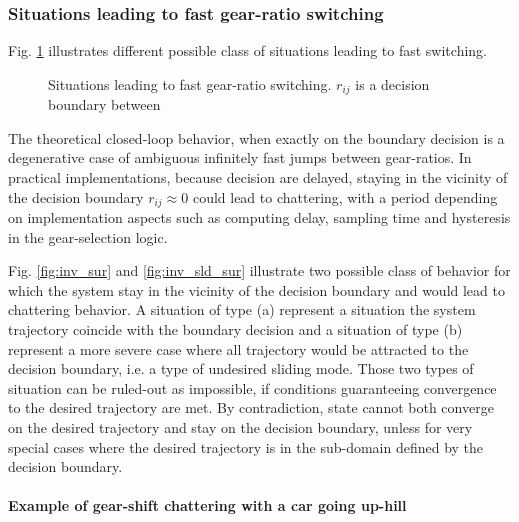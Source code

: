\subsubsection{Situations leading to fast gear-ratio switching}

Fig. \ref{fig:chatsit} illustrates different possible class of situations leading to fast switching.
%
\begin{figure}[htp]
        \centering
				\hspace{+3pt}
				\hspace{+3pt}
        \caption{Situations leading to fast gear-ratio switching. $r_{ij}$ is a decision boundary between }\label{fig:chatsit}
\end{figure}


The theoretical closed-loop behavior, when exactly on the boundary decision is a degenerative case of ambiguous infinitely fast jumps between gear-ratios. In practical implementations, because decision are delayed, staying in the vicinity of the decision boundary $r_{ij} \approx 0 $ could lead to chattering, with a period depending on implementation aspects such as computing delay, sampling time and hysteresis in the gear-selection logic. 

Fig. \ref{fig:inv_sur} and \ref{fig:inv_sld_sur} illustrate two possible class of behavior for which the system stay in the vicinity of the decision boundary and would lead to chattering behavior. A situation of type (a) represent a situation the system trajectory coincide with the boundary decision and a situation of type (b) represent a more severe case where all trajectory would be attracted to the decision boundary, i.e. a type of undesired sliding mode. Those two types of situation can be ruled-out as impossible, if conditions guaranteeing convergence to the desired trajectory are met. By contradiction, state cannot both converge on the desired trajectory and stay on the decision boundary, unless for very special cases where the desired trajectory is in the sub-domain defined by the decision boundary. 

\paragraph{Example of gear-shift chattering with a car going up-hill}

